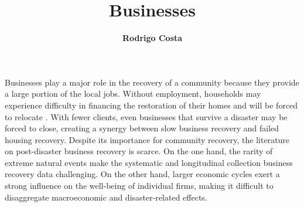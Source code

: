 %
%
%


%
%
%
%
%
%
%
%

\title{Businesses}
\author{
    \textbf{Rodrigo Costa}}
\tocauthor{}
%
%
\maketitle
Businesses play a major role in the recovery of a community because they provide a large portion of the local jobs. Without employment, households may experience difficulty in financing the restoration of their homes and will be forced to relocate \citep{bolin1983recovery,wang2015influencing}. With fewer clients, even businesses that survive a disaster may be forced to close, creating a synergy between slow business recovery and failed housing recovery. Despite its importance for community recovery, the literature on post-disaster business recovery is scarce. On the one hand, the rarity of extreme natural events make the systematic and longitudinal collection business recovery data challenging. On the other hand, larger economic cycles exert a strong influence on the well-being of individual firms, making it difficult to disaggregate macroeconomic and disaster-related effects.

